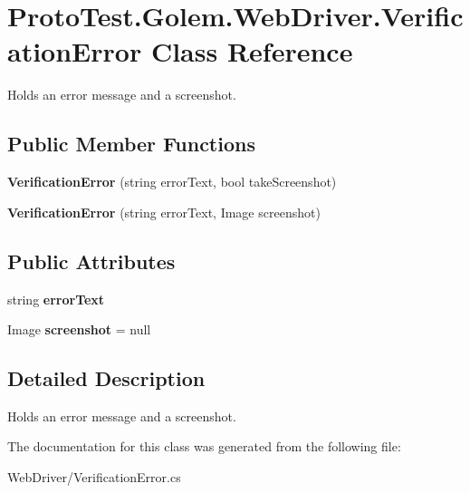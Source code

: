 \hypertarget{class_proto_test_1_1_golem_1_1_web_driver_1_1_verification_error}{\section{Proto\-Test.\-Golem.\-Web\-Driver.\-Verification\-Error Class Reference}
\label{class_proto_test_1_1_golem_1_1_web_driver_1_1_verification_error}
}


Holds an error message and a screenshot.  


\subsection*{Public Member Functions}
\begin{DoxyCompactItemize}
\item 
\hypertarget{class_proto_test_1_1_golem_1_1_web_driver_1_1_verification_error_ab4951c08835d3322ea748214267fc326}{{\bfseries Verification\-Error} (string error\-Text, bool take\-Screenshot)}\label{class_proto_test_1_1_golem_1_1_web_driver_1_1_verification_error_ab4951c08835d3322ea748214267fc326}

\item 
\hypertarget{class_proto_test_1_1_golem_1_1_web_driver_1_1_verification_error_ad86b6d8c6c58a0b5de8d6bc03874bed2}{{\bfseries Verification\-Error} (string error\-Text, Image screenshot)}\label{class_proto_test_1_1_golem_1_1_web_driver_1_1_verification_error_ad86b6d8c6c58a0b5de8d6bc03874bed2}

\end{DoxyCompactItemize}
\subsection*{Public Attributes}
\begin{DoxyCompactItemize}
\item 
\hypertarget{class_proto_test_1_1_golem_1_1_web_driver_1_1_verification_error_ad0f8498eb2f52f2b9659311b6a1ee9e4}{string {\bfseries error\-Text}}\label{class_proto_test_1_1_golem_1_1_web_driver_1_1_verification_error_ad0f8498eb2f52f2b9659311b6a1ee9e4}

\item 
\hypertarget{class_proto_test_1_1_golem_1_1_web_driver_1_1_verification_error_a7e17831a0e9298cbba4dd7f952875ffb}{Image {\bfseries screenshot} = null}\label{class_proto_test_1_1_golem_1_1_web_driver_1_1_verification_error_a7e17831a0e9298cbba4dd7f952875ffb}

\end{DoxyCompactItemize}


\subsection{Detailed Description}
Holds an error message and a screenshot. 



The documentation for this class was generated from the following file\-:\begin{DoxyCompactItemize}
\item 
Web\-Driver/Verification\-Error.\-cs\end{DoxyCompactItemize}
